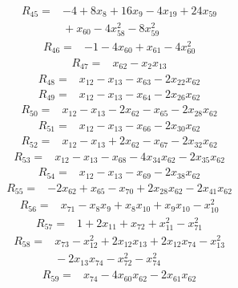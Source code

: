\begin{align*}
R_{45} ={}& -4 + 8x_{8} + 16x_{9} - 4x_{19} + 24x_{59} \\
&{} + x_{60} - 4x_{58}^{2} - 8x_{59}^{2}
\end{align*}
\begin{align*}
R_{46} ={}& -1 - 4x_{60} + x_{61} - 4x_{60}^{2}
\end{align*}
\begin{align*}
R_{47} ={}& x_{62} - x_{2} x_{13}
\end{align*}
\begin{align*}
R_{48} ={}& x_{12} - x_{13} - x_{63} - 2x_{22} x_{62}
\end{align*}
\begin{align*}
R_{49} ={}& x_{12} - x_{13} - x_{64} - 2x_{26} x_{62}
\end{align*}
\begin{align*}
R_{50} ={}& x_{12} - x_{13} - 2x_{62} - x_{65} - 2x_{28} x_{62}
\end{align*}
\begin{align*}
R_{51} ={}& x_{12} - x_{13} - x_{66} - 2x_{30} x_{62}
\end{align*}
\begin{align*}
R_{52} ={}& x_{12} - x_{13} + 2x_{62} - x_{67} - 2x_{32} x_{62}
\end{align*}
\begin{align*}
R_{53} ={}& x_{12} - x_{13} - x_{68} - 4x_{34} x_{62} - 2x_{35} x_{62}
\end{align*}
\begin{align*}
R_{54} ={}& x_{12} - x_{13} - x_{69} - 2x_{38} x_{62}
\end{align*}
\begin{align*}
R_{55} ={}& -2x_{62} + x_{65} - x_{70} + 2x_{28} x_{62} - 2x_{41} x_{62}
\end{align*}
\begin{align*}
R_{56} ={}& x_{71} - x_{8} x_{9} + x_{8} x_{10} + x_{9} x_{10} - x_{10}^{2}
\end{align*}
\begin{align*}
R_{57} ={}& 1 + 2x_{11} + x_{72} + x_{11}^{2} - x_{71}^{2}
\end{align*}
\begin{align*}
R_{58} ={}& x_{73} - x_{12}^{2} + 2x_{12} x_{13} + 2x_{12} x_{74} - x_{13}^{2} \\
&{} -2x_{13} x_{74} - x_{72}^{2} - x_{74}^{2}
\end{align*}
\begin{align*}
R_{59} ={}& x_{74} - 4x_{60} x_{62} - 2x_{61} x_{62}
\end{align*}
